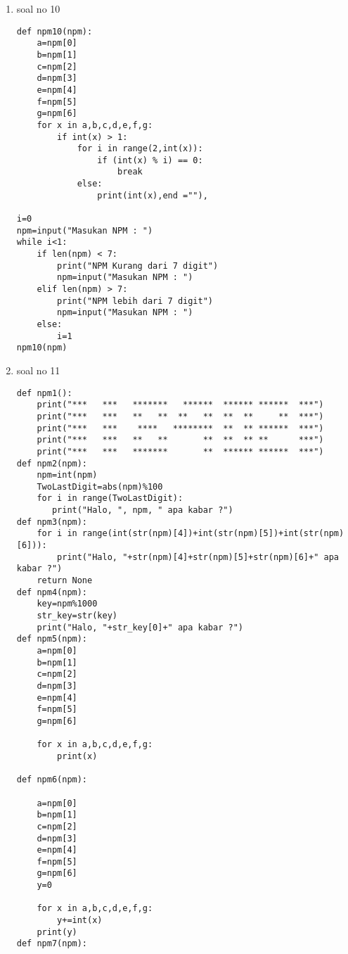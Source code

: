 \begin{enumerate}
\begin{lstlisting}
        if int(x)%2==1:
            print(x,end ="")

i=0
npm=input("Masukan NPM : ")
while i<1:
    if len(npm) < 7:
        print("NPM Kurang dari 7 digit")
        npm=input("Masukan NPM : ")
    elif len(npm) > 7:
        print("NPM lebih dari 7 digit")
        npm=input("Masukan NPM : ")
    else:
        i=1
npm9(npm)
\end{lstlisting}
\item soal no 10
\begin{lstlisting}
def npm10(npm):
    a=npm[0]
    b=npm[1]
    c=npm[2]
    d=npm[3]
    e=npm[4]
    f=npm[5]
    g=npm[6]
    for x in a,b,c,d,e,f,g:    
        if int(x) > 1:
            for i in range(2,int(x)):
                if (int(x) % i) == 0:
                    break
            else:
                print(int(x),end =""),

i=0
npm=input("Masukan NPM : ")
while i<1:
    if len(npm) < 7:
        print("NPM Kurang dari 7 digit")
        npm=input("Masukan NPM : ")
    elif len(npm) > 7:
        print("NPM lebih dari 7 digit")
        npm=input("Masukan NPM : ")
    else:
        i=1
npm10(npm)
\end{lstlisting}
\item soal no 11
\begin{lstlisting}
def npm1():
    print("***   ***   *******   ******  ****** ******  ***")
    print("***   ***   **   **  **   **  **  **     **  ***")
    print("***   ***    ****   ********  **  ** ******  ***")
    print("***   ***   **   **       **  **  ** **      ***")
    print("***   ***   *******       **  ****** ******  ***")
def npm2(npm):
    npm=int(npm)
    TwoLastDigit=abs(npm)%100
    for i in range(TwoLastDigit):
       print("Halo, ", npm, " apa kabar ?")
def npm3(npm):
    for i in range(int(str(npm)[4])+int(str(npm)[5])+int(str(npm)[6])):
        print("Halo, "+str(npm)[4]+str(npm)[5]+str(npm)[6]+" apa kabar ?")
    return None
def npm4(npm):
    key=npm%1000
    str_key=str(key)
    print("Halo, "+str_key[0]+" apa kabar ?")
def npm5(npm):
    a=npm[0]
    b=npm[1]
    c=npm[2]
    d=npm[3]
    e=npm[4]
    f=npm[5]
    g=npm[6]

    for x in a,b,c,d,e,f,g:
        print(x)

def npm6(npm):

    a=npm[0]
    b=npm[1]
    c=npm[2]
    d=npm[3]
    e=npm[4]
    f=npm[5]
    g=npm[6]
    y=0

    for x in a,b,c,d,e,f,g:
        y+=int(x)
    print(y)
def npm7(npm):


\end{lstlisting}
\end{enumerate}
